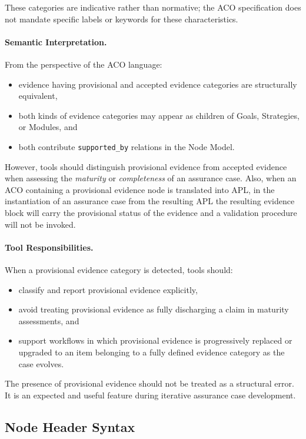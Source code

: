 \documentclass[11pt]{article}
\begin{document}
These categories are indicative rather than normative; the ACO specification does
not mandate specific labels or keywords for these characteristics.

\paragraph{Semantic Interpretation.}
From the perspective of the ACO language:
\begin{itemize}[leftmargin=2em]
  \item evidence having provisional and accepted evidence categories are structurally equivalent,
  \item both kinds of evidence categories may appear as children of Goals, Strategies, or Modules, and
  \item both contribute \texttt{supported\_by} relations in the Node Model.
\end{itemize}

However, tools should distinguish provisional evidence from accepted evidence when
assessing the \emph{maturity} or \emph{completeness} of an assurance case.
Also, when an ACO containing a provisional evidence node is translated into APL, in the instantiation of an assurance case from the resulting APL the resulting evidence block will carry the provisional status of the evidence and a validation procedure will not be invoked.

\paragraph{Tool Responsibilities.}
When a provisional evidence category is detected, tools should:
\begin{itemize}[leftmargin=2em]
  \item classify and report provisional evidence explicitly,
  \item avoid treating provisional evidence as fully discharging a claim in
        maturity assessments, and
  \item support workflows in which provisional evidence is progressively replaced
        or upgraded to an item belonging to a fully defined evidence category as the case evolves.
\end{itemize}

The presence of provisional evidence should not be treated as a structural error.
It is an expected and useful feature during iterative assurance case development.

\subsection{Node Header Syntax}
\end{document}
